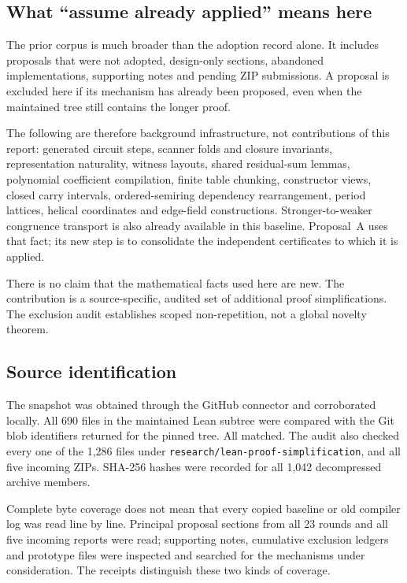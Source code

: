\documentclass[11pt,letterpaper]{article}
\newcommand{\code}[1]{\nolinkurl{#1}}
\begin{document}
\subsection{What ``assume already applied'' means here}

The prior corpus is much broader than the adoption record alone. It includes proposals that were not adopted, design-only sections, abandoned implementations, supporting notes and pending ZIP submissions. A proposal is excluded here if its mechanism has already been proposed, even when the maintained tree still contains the longer proof.

The following are therefore background infrastructure, not contributions of this report: generated circuit steps, scanner folds and closure invariants, representation naturality, witness layouts, shared residual-sum lemmas, polynomial coefficient compilation, finite table chunking, constructor views, closed carry intervals, ordered-semiring dependency rearrangement, period lattices, helical coordinates and edge-field constructions. Stronger-to-weaker congruence transport is also already available in this baseline. Proposal~A uses that fact; its new step is to consolidate the independent certificates to which it is applied.

There is no claim that the mathematical facts used here are new. The contribution is a source-specific, audited set of additional proof simplifications. The exclusion audit establishes scoped non-repetition, not a global novelty theorem.

\subsection{Source identification}

The snapshot was obtained through the GitHub connector and corroborated locally. All 690 files in the maintained Lean subtree were compared with the Git blob identifiers returned for the pinned tree. All matched. The audit also checked every one of the 1,286 files under \code{research/lean-proof-simplification}, and all five incoming ZIPs. SHA-256 hashes were recorded for all 1,042 decompressed archive members.

Complete byte coverage does not mean that every copied baseline or old compiler log was read line by line. Principal proposal sections from all 23 rounds and all five incoming reports were read; supporting notes, cumulative exclusion ledgers and prototype files were inspected and searched for the mechanisms under consideration. The receipts distinguish these two kinds of coverage.
\end{document}
